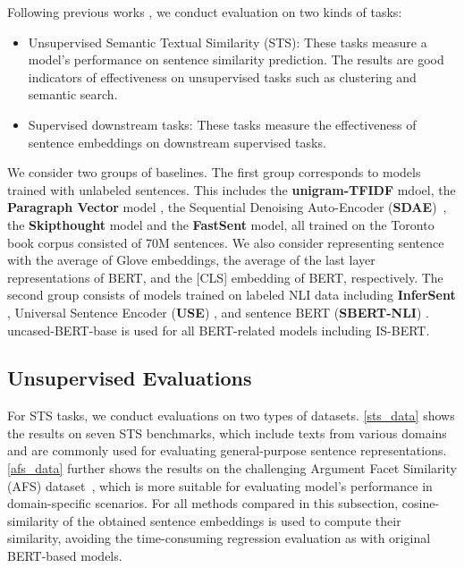 \documentclass[11pt,a4paper]{article}
\begin{document}
Following previous works \cite{reimers2019,hill2016}, we conduct evaluation on two kinds of tasks:
\begin{itemize}[noitemsep,topsep=3pt]
    \item Unsupervised Semantic Textual Similarity (STS): These tasks measure a model's performance on sentence similarity prediction. The results are good indicators of effectiveness on unsupervised tasks such as clustering and semantic search. 
    \item Supervised downstream tasks: These tasks measure the effectiveness of sentence embeddings on downstream supervised tasks.
\end{itemize}

We consider two groups of baselines. The first group corresponds to models trained with unlabeled sentences. This includes the \textbf{unigram-TFIDF} mdoel, the \textbf{Paragraph Vector} model \cite{Le2014}, the Sequential Denoising Auto-Encoder (\textbf{SDAE})~\cite{hill2016}, the \textbf{Skipthought} \cite{Kiros2015} model and the \textbf{FastSent} \cite{hill2016} model,  all trained on the Toronto book corpus \cite{zhu2015} consisted of 70M sentences. We also consider representing sentence with the average of Glove embeddings, the average of the last layer representations of BERT, and the [CLS] embedding of BERT, respectively. 
The second group consists of models trained on labeled NLI data including \textbf{InferSent} \cite{conneau2017}, Universal Sentence Encoder (\textbf{USE}) \cite{cer2018}, and sentence BERT (\textbf{SBERT-NLI}) \cite{reimers2019}.
uncased-BERT-base is used for all BERT-related models including IS-BERT.



\subsection{Unsupervised Evaluations}
For STS tasks, we conduct evaluations on two types of datasets. \ref{sts_data} shows the results on seven STS benchmarks, which include texts from various domains and are commonly used for evaluating general-purpose sentence representations. \ref{afs_data} further shows the results on the challenging Argument Facet Similarity (AFS) dataset~\cite{misra2016}, which is more suitable for evaluating model's performance in domain-specific scenarios. 
For all methods compared in this subsection, cosine-similarity of the obtained sentence embeddings is used to compute their similarity, avoiding the time-consuming regression evaluation as with original BERT-based models. 
\end{document}
